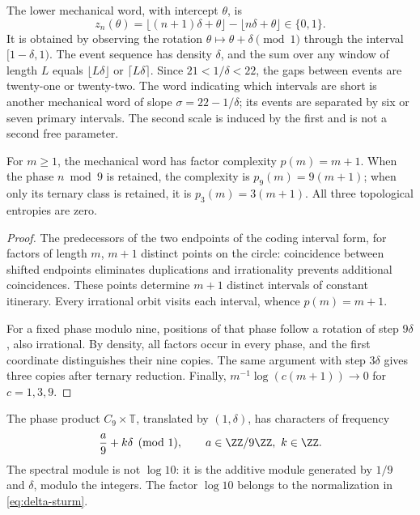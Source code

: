 The lower mechanical word, with intercept \(\theta\), is
\[
 z_n(\theta)=\lfloor(n+1)\delta+\theta\rfloor-\lfloor n\delta+\theta\rfloor\in\{0,1\}.
\]
It is obtained by observing the rotation \(\theta\mapsto\theta+\delta\pmod1\) through the interval \([1-\delta,1)\). The event sequence has density \(\delta\), and the sum over any window of length \(L\) equals \(\lfloor L\delta\rfloor\) or \(\lceil L\delta\rceil\). Since \(21<1/\delta<22\), the gaps between events are twenty-one or twenty-two. The word indicating which intervals are short is another mechanical word of slope \(\sigma=22-1/\delta\); its events are separated by six or seven primary intervals. The second scale is induced by the first and is not a second free parameter.



\begin{theorem}
For \(m\ge1\), the mechanical word has factor complexity \(p(m)=m+1\). When the phase \(n\bmod9\) is retained, the complexity is \(p_9(m)=9(m+1)\); when only its ternary class is retained, it is \(p_3(m)=3(m+1)\). All three topological entropies are zero.
\end{theorem}
\begin{proof}
The predecessors of the two endpoints of the coding interval form, for factors of length \(m\), \(m+1\) distinct points on the circle: coincidence between shifted endpoints eliminates duplications and irrationality prevents additional coincidences. These points determine \(m+1\) distinct intervals of constant itinerary. Every irrational orbit visits each interval, whence \(p(m)=m+1\).

For a fixed phase modulo nine, positions of that phase follow a rotation of step \(9\delta\), also irrational. By density, all factors occur in every phase, and the first coordinate distinguishes their nine copies. The same argument with step \(3\delta\) gives three copies after ternary reduction. Finally, \(m^{-1}\log(c(m+1))\to0\) for \(c=1,3,9\).
\end{proof}

The phase product \(C_9\times\mathbb T\), translated by \((1,\delta)\), has characters of frequency
\[
 \frac a9+k\delta\pmod1,\qquad a\in\ZZ/9\ZZ,\ k\in\ZZ.
\]
The spectral module is not \(\log10\): it is the additive module generated by \(1/9\) and \(\delta\), modulo the integers. The factor \(\log10\) belongs to the normalization in \eqref{eq:delta-sturm}.

